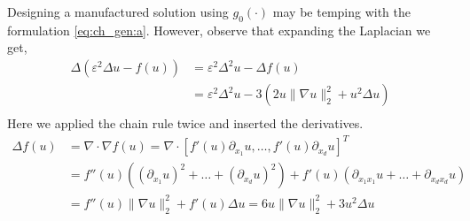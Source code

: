     Designing a manufactured solution using $g_{0}( \cdot ) $ may be temping with the formulation \eqref{eq:ch_gen:a}. However, observe that expanding the Laplacian we get,
    \begin{equation}
    \begin{split}
        \Delta  \left(  \varepsilon^2  \Delta u - f( u) \right) & = \varepsilon^2 \Delta^2 u -  \Delta f( u) \\
                                                                                    &= \varepsilon^{2} \Delta ^2 u  - 3( 2u \| \nabla u \|_{ 2 }^{ 2 } + u^{2}  \Delta u )   \\
    \end{split}
    \end{equation}
Here we applied the chain rule twice and inserted the derivatives.
\begin{equation}
    \label{eq:nonlinear_laplace}
    \begin{split}
\Delta f( u)  &= \nabla \cdot \nabla f( u)  = \nabla \cdot  \left[ f' ( u) \partial _{x_{1}}u, \ldots, f' ( u) \partial _{x_{d}}u \right] ^{T} \\
& =  f'' ( u)( ( \partial _{x_{1}}u )^{2} + \ldots +( \partial _{x_{d}}u )^{2} ) +  f' ( u)( \partial _{x_{1} x_{1}}u + \ldots +   \partial _{x_{d} x_{d}}u ) \\
&=  f'' ( u) \| \nabla u \|_{ 2 }^{ 2 } + f' ( u)  \Delta u  = 6u \| \nabla u \|_{ 2 }^{ 2 } + 3u^{2}  \Delta u
    \end{split}
\end{equation}

